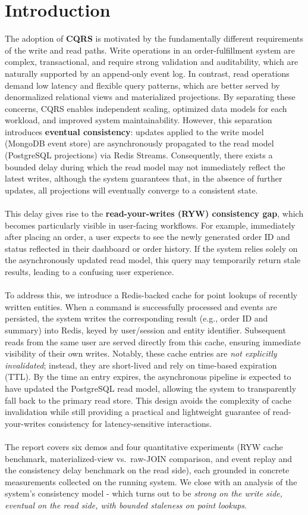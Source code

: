 \documentclass[11pt,a4paper]{article}
\begin{document}
\section{Introduction}
The adoption of \textbf{CQRS} is motivated by the fundamentally different requirements of the write and read paths. Write operations in an order-fulfillment system are complex, transactional, and require strong validation and auditability, which are naturally supported by an append-only event log. In contrast, read operations demand low latency and flexible query patterns, which are better served by denormalized relational views and materialized projections. By separating these concerns, CQRS enables independent scaling, optimized data models for each workload, and improved system maintainability. However, this separation introduces \textbf{eventual consistency}: updates applied to the write model (MongoDB event store) are asynchronously propagated to the read model (PostgreSQL projections) via Redis Streams. Consequently, there exists a bounded delay during which the read model may not immediately reflect the latest writes, although the system guarantees that, in the absence of further updates, all projections will eventually converge to a consistent state.\\\\
This delay gives rise to the \textbf{read-your-writes (RYW) consistency gap}, which becomes particularly visible in user-facing workflows. For example, immediately after placing an order, a user expects to see the newly generated order ID and status reflected in their dashboard or order history. If the system relies solely on the asynchronously updated read model, this query may temporarily return stale results, leading to a confusing user experience.\\\\
To address this, we introduce a Redis-backed cache for point lookups of recently written entities. When a command is successfully processed and events are persisted, the system writes the corresponding result (e.g., order ID and summary) into Redis, keyed by user/session and entity identifier. Subsequent reads from the same user are served directly from this cache, ensuring immediate visibility of their own writes. Notably, these cache entries are \emph{not explicitly invalidated}; instead, they are short-lived and rely on time-based expiration (TTL). By the time an entry expires, the asynchronous pipeline is expected to have updated the PostgreSQL read model, allowing the system to transparently fall back to the primary read store. This design avoids the complexity of cache invalidation while still providing a practical and lightweight guarantee of read-your-writes consistency for latency-sensitive interactions.\\\\
The report covers six demos and four quantitative experiments (RYW cache benchmark, materialized-view vs.\ raw-JOIN comparison, and event replay and the consistency delay benchmark on the read side), each grounded in concrete measurements collected on the running system. We close with an analysis of the system's consistency model - which turns out to be \emph{strong on the write side, eventual on the read side, with bounded staleness on point lookups}.
\end{document}
